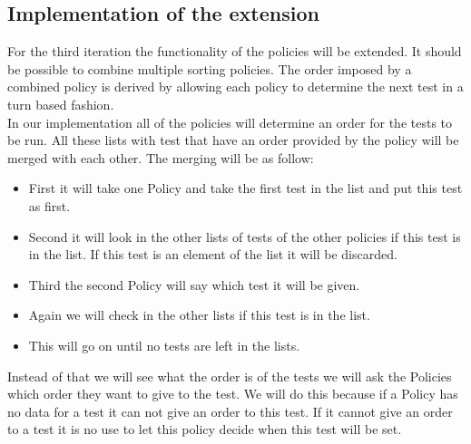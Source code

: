 \documentclass[i3]{oss}
\begin{document}
\subsection{Implementation of the extension}
\label{ss:implemenext}

For the third iteration the functionality of the policies will be extended. 
It should be possible to combine multiple sorting policies.
The order imposed by a combined policy is derived by allowing each policy to determine the next test in a turn based fashion.\\

In our implementation all of the policies will determine an order for the tests to be run. All these lists with test that have an order provided by the policy will be merged with each other. The merging will be as follow: 
\begin{itemize}
\item First it will take one Policy and take the first test in the list and put this test as first.
\item Second it will look in the other lists of tests of the other policies if this test is in the list. If this test is an element of the list it will be discarded. 
\item Third the second Policy will say which test it will be given.
\item Again we will check in the other lists if this test is in the list.
\item This will go on until no tests are left in the lists.
\end{itemize}

Instead of that we will see what the order is of the tests we will ask the Policies which order they want to give to the test. We will do this because if a Policy has no data for a test it can not give an order to this test. If it cannot give an order to a test it is no use to let this policy decide when this test will be set. 
\end{document}
